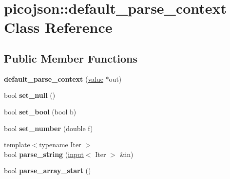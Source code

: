 \hypertarget{classpicojson_1_1default__parse__context}{\section{picojson\-:\-:default\-\_\-parse\-\_\-context Class Reference}
\label{classpicojson_1_1default__parse__context}
}
\subsection*{Public Member Functions}
\begin{DoxyCompactItemize}
\item 
\hypertarget{classpicojson_1_1default__parse__context_ad326572abe85f9d05dc23be4cf76ff3c}{{\bfseries default\-\_\-parse\-\_\-context} (\hyperlink{classpicojson_1_1value}{value} $\ast$out)}\label{classpicojson_1_1default__parse__context_ad326572abe85f9d05dc23be4cf76ff3c}

\item 
\hypertarget{classpicojson_1_1default__parse__context_a2d852ba1f0b115c89378fcb5f10580b5}{bool {\bfseries set\-\_\-null} ()}\label{classpicojson_1_1default__parse__context_a2d852ba1f0b115c89378fcb5f10580b5}

\item 
\hypertarget{classpicojson_1_1default__parse__context_ae1935ef455fc2bed9195426cfee5713a}{bool {\bfseries set\-\_\-bool} (bool b)}\label{classpicojson_1_1default__parse__context_ae1935ef455fc2bed9195426cfee5713a}

\item 
\hypertarget{classpicojson_1_1default__parse__context_a9b2046a9cb6d66aad835b84ffda20b86}{bool {\bfseries set\-\_\-number} (double f)}\label{classpicojson_1_1default__parse__context_a9b2046a9cb6d66aad835b84ffda20b86}

\item 
\hypertarget{classpicojson_1_1default__parse__context_a476c7d30a5cf382b48201ec64585c2f3}{{\footnotesize template$<$typename Iter $>$ }\\bool {\bfseries parse\-\_\-string} (\hyperlink{classpicojson_1_1input}{input}$<$ Iter $>$ \&in)}\label{classpicojson_1_1default__parse__context_a476c7d30a5cf382b48201ec64585c2f3}

\item 
\hypertarget{classpicojson_1_1default__parse__context_a5c355f843ceacde134997f5bbbda1d23}{bool {\bfseries parse\-\_\-array\-\_\-start} ()}\label{classpicojson_1_1default__parse__context_a5c355f843ceacde134997f5bbbda1d23}


\end{DoxyCompactItemize}
